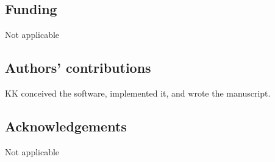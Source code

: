 \documentclass{bmcart}
\begin{document}
\subsection*{Funding}
Not applicable

\subsection*{Authors' contributions}
KK conceived the software, implemented it, and wrote the manuscript.

\subsection*{Acknowledgements}
Not applicable

\end{document}
